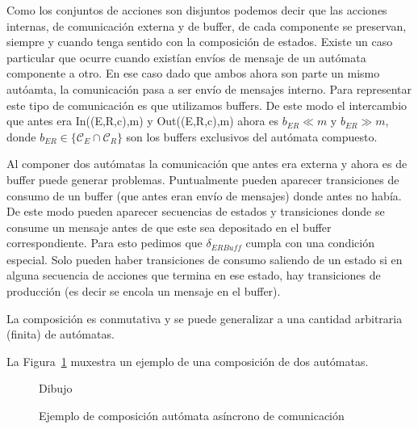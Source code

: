 \begin{definition}[Composición]
Como los conjuntos de acciones son disjuntos podemos decir que las acciones internas, de comunicación externa y de buffer, de cada componente se preservan, siempre y cuando tenga sentido con la composición de estados. Existe un caso particular que ocurre cuando existían envíos de mensaje de un autómata componente a otro. En ese caso dado que ambos ahora son parte un mismo autóamta, la comunicación pasa a ser envío de mensajes interno. Para representar este tipo de comunicación es que utilizamos buffers. De este modo el intercambio que antes era In((E,R,c),m) y Out((E,R,c),m) ahora es $b_{ER}  \ll m$ y $b_{ER}  \gg  m$, donde $ b_{ER} \in \{ \mathcal{C}_E \cap \mathcal{C}_R \} $ son los buffers exclusivos del autómata compuesto. 

Al componer dos autómatas la comunicación que antes era externa y ahora es de buffer puede generar problemas. Puntualmente pueden aparecer transiciones de consumo de un buffer (que antes eran envío de mensajes) donde antes no había. De este modo pueden aparecer secuencias de estados y transiciones donde se consume un mensaje antes de que este sea depositado en el buffer correspondiente. Para esto pedimos que $\delta_\mathit{ERBuff}$ cumpla con una condición especial. Solo pueden haber transiciones de consumo saliendo de un estado si en alguna secuencia de acciones que termina en ese estado, hay transiciones de producción (es decir se encola un mensaje en el buffer).

La composición es conmutativa y se puede generalizar a una cantidad arbitraria (finita) de autómatas.

\end{definition}





La Figura~\ref{fig:ejemplo-aa} muxestra un ejemplo de una composición de dos autómatas. 

\begin{figure}[ht]
\begin{center}
Dibujo
\end{center}
\caption{Ejemplo de composición autómata asíncrono de comunicación}
\label{fig:ejemplo-aa}
\end{figure} 

